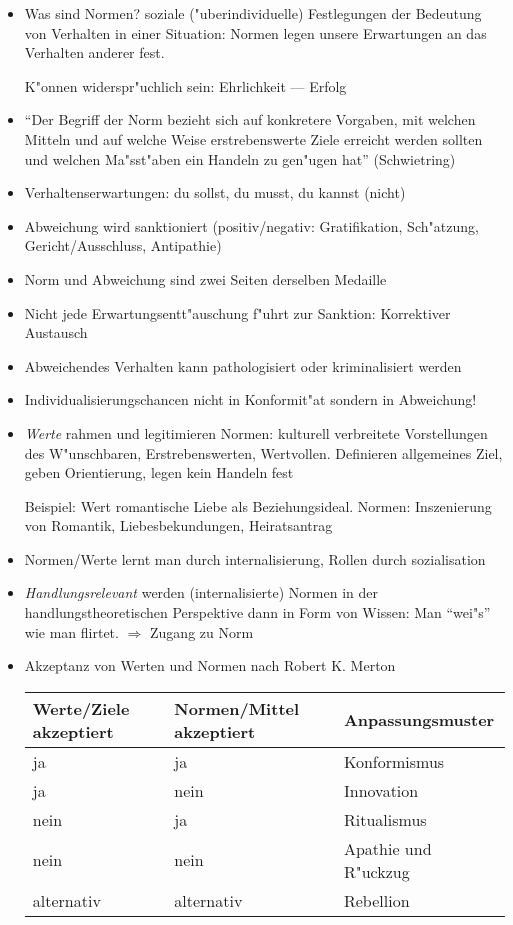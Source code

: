 \documentclass[a4paper, 12pt]{scrartcl}
\begin{document}
\begin{itemize}
	\item
		Was sind Normen? soziale ("uberindividuelle) Festlegungen der Bedeutung von Verhalten in einer Situation: Normen legen unsere Erwartungen an das Verhalten anderer fest.

		K"onnen widerspr"uchlich sein: Ehrlichkeit --- Erfolg
	\item
		\enquote{Der Begriff der Norm bezieht sich auf konkretere Vorgaben, mit welchen Mitteln und auf welche Weise erstrebenswerte Ziele erreicht werden sollten und welchen Ma"sst"aben ein Handeln zu gen"ugen hat} (Schwietring)
	\item
		Verhaltenserwartungen: du sollst, du musst, du kannst (nicht)
	\item
		Abweichung wird sanktioniert (positiv/negativ: Gratifikation, Sch"atzung, Gericht/Ausschluss, Antipathie)
	\item
		Norm und Abweichung sind zwei Seiten derselben Medaille
	\item
		Nicht jede Erwartungsentt"auschung f"uhrt zur Sanktion: Korrektiver Austausch
	\item
		Abweichendes Verhalten kann pathologisiert oder kriminalisiert werden

	\item
		Individualisierungschancen nicht in Konformit"at sondern in Abweichung!
	\item
		\textit{Werte} rahmen und legitimieren Normen: kulturell verbreitete Vorstellungen des W"unschbaren, Erstrebenswerten, Wertvollen. Definieren allgemeines Ziel, geben Orientierung, legen kein Handeln fest

		Beispiel: Wert romantische Liebe als Beziehungsideal. Normen: Inszenierung von Romantik, Liebesbekundungen, Heiratsantrag
	\item
		Normen/Werte lernt man durch internalisierung, Rollen durch sozialisation
	\item
		\textit{Handlungsrelevant} werden (internalisierte) Normen in der handlungstheoretischen Perspektive dann in Form von Wissen: Man \enquote{wei"s} wie man flirtet. $\Rightarrow$ Zugang zu Norm

	\item
		Akzeptanz von Werten und Normen nach Robert K. Merton

		\begin{tabular}[H]{lll}
			Werte/Ziele akzeptiert & Normen/Mittel akzeptiert & Anpassungsmuster\\ \hline
			ja & ja & Konformismus \\ \hline
			ja & nein & Innovation \\ \hline
			nein & ja & Ritualismus \\ \hline
			nein & nein & Apathie und R"uckzug \\ \hline
			alternativ & alternativ & Rebellion \\ \hline
		\end{tabular}
\end{itemize}
\end{document}
